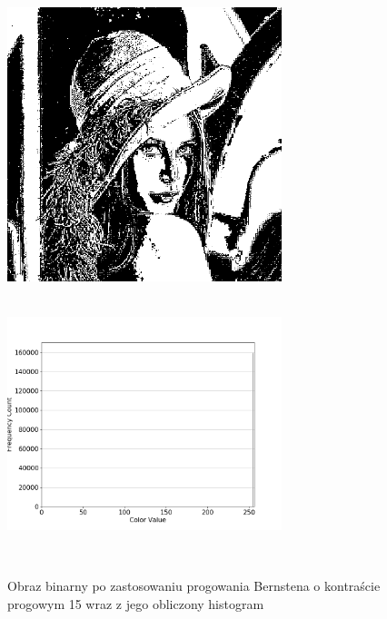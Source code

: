 \documentclass[a4paper,12pt]{book}
\begin{document}
\begin{figure}[H]
	\caption{Obraz binarny po zastosowaniu progowania Bernstena o kontraście progowym 15 wraz z jego obliczony histogram}
	\includegraphics[width=8cm, height=8cm]{5-4/local-threshold-image-lena-15.png}
	\includegraphics[width=8cm, height=8cm]{5-4/local-threshold-lena-15.png}
\end{figure}
\end{document}
